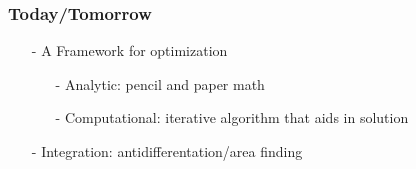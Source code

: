 \documentclass{beamer}
\numberwithin{equation}{section}
\begin{document}
\begin{frame}
\frametitle{Today/Tomorrow}

\begin{itemize}
\item[-] A Framework for optimization
\begin{itemize}
\item[-] Analytic: pencil and paper math
\item[-] Computational: iterative algorithm that aids in solution
\end{itemize}
\item[-] Integration: antidifferentation/area finding
\end{itemize}

\end{frame}
\end{document}
